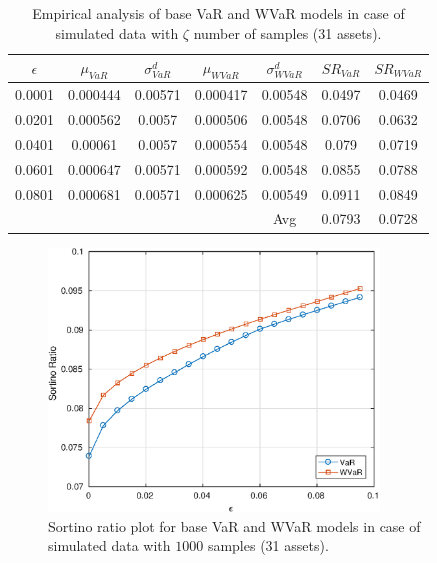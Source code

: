 \documentclass[12pt]{article}
\numberwithin{equation}{section}
\begin{document}
\begin{table}[!h]
\centering
\captionsetup{justification=centering}
\begin{tabular}{||c|c|c|c|c|c|c||}
\hline
$\epsilon$ & $\mu_{VaR}$ & $\sigma_{VaR}^{d}$ & $\mu_{WVaR}$ & $\sigma_{WVaR}^{d}$ & $SR_{VaR}$ & $SR_{WVaR}$\\
\hline
0.0001 & 0.000444 & 0.00571 & 0.000417 & 0.00548 & 0.0497 & 0.0469 \\
0.0201 & 0.000562 & 0.0057 & 0.000506 & 0.00548 & 0.0706 & 0.0632 \\
0.0401 & 0.00061 & 0.0057 & 0.000554 & 0.00548 & 0.079 & 0.0719 \\
0.0601 & 0.000647 & 0.00571 & 0.000592 & 0.00548 & 0.0855 & 0.0788 \\
0.0801 & 0.000681 & 0.00571 & 0.000625 & 0.00549 & 0.0911 & 0.0849 \\
\hline
& & & & Avg & 0.0793 & 0.0728 \\
\hline
\end{tabular}
\caption{Empirical analysis of base VaR and WVaR models in case of simulated data with $\zeta$ number of samples (31 assets).}
\label{tab:5.2}
\end{table}

\begin{figure}[!h]
\centering
\includegraphics[height=7.0cm]{var_30s_1000.eps}
\caption{Sortino ratio plot for base VaR and WVaR models in case of simulated data with $1000$ samples (31 assets).}
\label{fig:5.3}
\end{figure}
\end{document}
